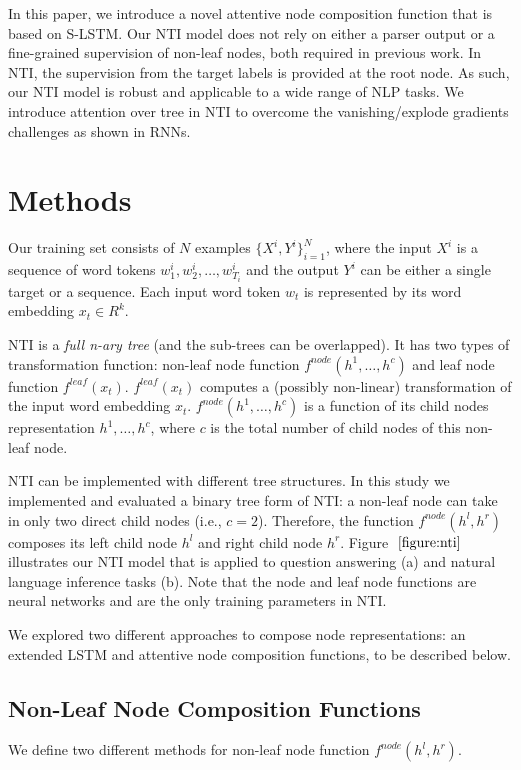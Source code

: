 \documentclass[11pt]{article}
\begin{document}
In this paper, we introduce a novel attentive node composition function that is based on S-LSTM. Our NTI model does not rely on either a parser output or a fine-grained supervision of non-leaf nodes, both required in previous work. In NTI, the supervision from the target labels is provided at the root node. As such, our NTI model is robust and applicable to a wide range of NLP tasks. We introduce attention over tree in NTI to overcome the vanishing/explode gradients challenges as shown in RNNs. 

\section{Methods}

Our training set consists of $N$ examples $\lbrace X^i,Y^i \rbrace^N_{i=1}$, where the input $X^i$ is a sequence of word tokens $w^i_1, w^i_2, \ldots, w^i_{T_i}$ and the output $Y^i$ can be either a single target or a sequence. Each input word token $w_t$ is represented by its word embedding $x_t \in R^k$.

NTI is a \textit{full n-ary tree} (and the sub-trees can be overlapped). It has two types of transformation function: non-leaf node function $f^{node}(h^1, \ldots, h^c)$ and leaf node function $f^{leaf}(x_t)$. $f^{leaf}(x_t)$ computes a (possibly non-linear) transformation of the input word embedding $x_t$. $f^{node}(h^1, \ldots, h^c)$ is a function of its child nodes representation $h^1, \ldots, h^c$, where  $c$ is the total number of child nodes of this non-leaf node. 

NTI can be implemented with different tree structures. In this study we implemented and evaluated a binary tree form of NTI: a non-leaf node can take in only two direct child nodes (i.e., $c=2$). Therefore, the function $f^{node}(h^l, h^r)$ composes its left child node $h^l$ and right child node $h^r$. Figure $~\ref{figure:nti}$ illustrates our NTI model that is applied to question answering (a) and natural language inference tasks (b). Note that the node and leaf node functions are neural networks and are the only training parameters in NTI.  

We explored two different approaches to compose node representations: an extended LSTM and attentive node composition functions, to be described below.    

\subsection{Non-Leaf Node Composition Functions}
We define two different methods for non-leaf node function $f^{node}(h^l, h^r)$.
\end{document}
